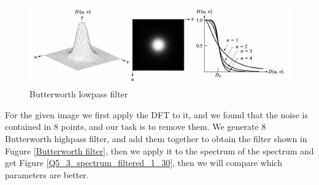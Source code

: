 \documentclass[
	12pt, %
]{style/fphw}
\begin{document}
\begin{figure}[H]
    \centering
    \includegraphics[width=0.8\linewidth]{chart/Butterworth.png}
    \caption{Butterworth lowpass filter}
    \label{Butterworth.png}
\end{figure}


For the given image we first apply the DFT to it, and we found that the noise is contained in 8 points, and our task is to remove them. We generate 8 Butterworth highpass filter, and add them together to obtain the filter shown in Fugure \ref{Butterworth filter}, then we apply it to the spectrum of the spectrum and get Figure \ref{Q5_3_spectrum_filtered_1_30}, then we will compare which parameters are better.
\end{document}
